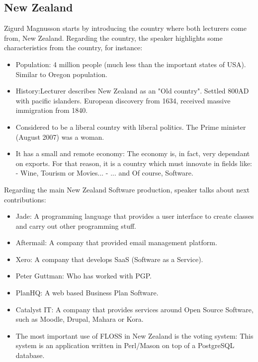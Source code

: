 \documentclass[11pt]{article}
\begin{document}
\subsection{New Zealand}
Zigurd Magnusson starts by introducing the country where both lecturers come from, New Zealand. Regarding the country, the speaker highlights some characteristics from the country, for instance:
\begin{itemize}\itemsep0pt
\item{Population}: 4 million people (much less than the important states of USA). Similar to Oregon population.
\item{History}:Lecturer describes New Zealand as an "Old country". Settled 800AD with pacific islanders. European discovery from 1634, received massive immigration from 1840.
\item{Considered to be a liberal country with liberal politics}. The Prime minister (August 2007) was a woman.
\item{It has a small and remote economy}: The economy is, in fact, very dependant on exports. For that reason, it is a country which must innovate in fields like:
    - Wine, Tourism or Movies...
    - ... and Of course, Software.
\end{itemize}
Regarding the main New Zealand Software production, speaker talks about next contributions:
\begin{itemize}\itemsep0pt
\item{Jade}: A programming language that provides a user interface to create classes and carry out other programming stuff.
\item{Aftermail}: A company that provided email management platform.
\item{Xero}: A company that develops SaaS (Software as a Service).
\item{Peter Guttman}: Who has worked with PGP.
\item{PlanHQ}: A web based Business Plan Software.
\item{Catalyst IT}: A company that provides services around Open Source Software, such as Moodle, Drupal, Mahara or Kora.
\item{The most important use of FLOSS in New Zealand is the voting system}: This system is an application written in Perl/Mason on top of a PostgreSQL database.
\end{itemize}
\end{document}
